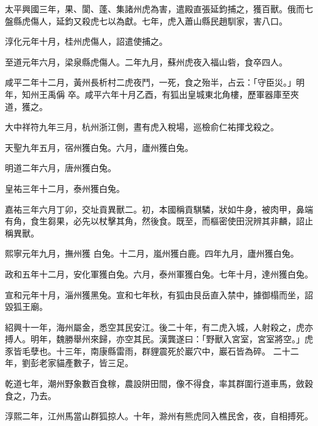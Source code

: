 \begin{pinyinscope}
 太平興國三年，果、閬、蓬、集諸州虎為害，遣殿直張延鈞捕之，獲百獸。俄而七盤縣虎傷人，延鈞又殺虎七以為獻。七年，虎入蕭山縣民趙馴家，害八口。



 淳化元年十月，桂州虎傷人，詔遣使捕之。



 至道元年六月，梁泉縣虎傷人。二年九月，蘇州虎夜入福山砦，食卒四人。



 咸平二年十二月，黃州長析村二虎夜鬥，一死，食之殆半，占云：「守臣災。」明年，知州王禹偁
 卒。咸平六年十月乙酉，有狐出皇城東北角樓，歷軍器庫至夾道，獲之。



 大中祥符九年三月，杭州浙江側，晝有虎入稅場，巡檢俞仁祐揮戈殺之。



 天聖九年五月，宿州獲白兔。六月，廬州獲白兔。



 明道二年六月，唐州獲白兔。



 皇祐三年十二月，泰州獲白兔。



 嘉祐三年六月丁卯，交址貢異獸二。初，本國稱貢騏驎，狀如牛身，被肉甲，鼻端有角，食生芻果，必先以杖擊其角，然後食。既至，而樞密使田況辨其非麟，詔止稱異獸。



 熙寧元年九月，撫州獲
 白兔。十二月，嵐州獲白鹿。四年九月，廬州獲白兔。



 政和五年十二月，安化軍獲白兔。六月，泰州軍獲白兔。七年十月，達州獲白兔。



 宣和元年十月，淄州獲黑兔。宣和七年秋，有狐由艮岳直入禁中，據御榻而坐，詔毀狐王廟。



 紹興十一年，海州屬金，悉空其民安江。後二十年，有二虎入城，人射殺之，虎亦搏人。明年，魏勝舉州來歸，亦空其民。漢龔遂曰：「野獸入宮室，宮室將空。」虎豕皆毛孽也。十三年，南康縣雷雨，群貍震死於巖穴中，巖石皆為碎。
 二十二年，劉彭老家貓產數子，皆三足。



 乾道七年，潮州野象數百食稼，農設阱田間，像不得食，率其群圍行道車馬，斂穀食之，乃去。



 淳熙二年，江州馬當山群狐掠人。十年，滁州有熊虎同入樵民舍，夜，自相搏死。




\end{pinyinscope}
